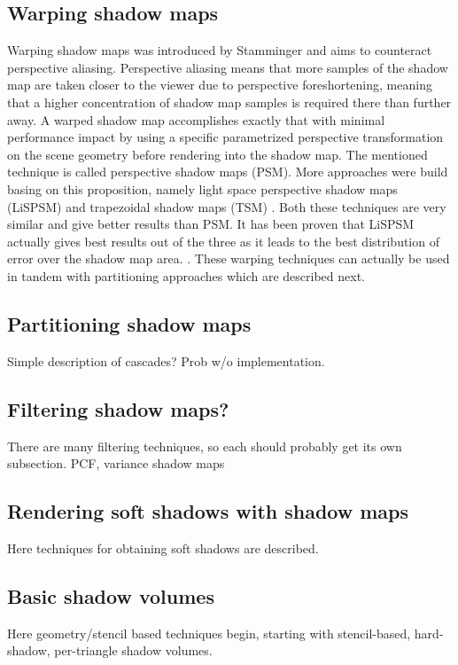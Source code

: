 \subsection{Warping shadow maps}
Warping shadow maps was introduced by Stamminger \cite{bib:article:stamminger_psm} and aims to counteract perspective aliasing. Perspective aliasing means that more samples of the shadow map are taken closer to the viewer due to perspective foreshortening, meaning that a higher concentration of shadow map samples is required there than further away. A warped shadow map accomplishes exactly that with minimal performance impact by using a specific parametrized perspective transformation on the scene geometry before rendering into the shadow map. The mentioned technique is called perspective shadow maps (PSM). More approaches were build basing on this proposition, namely light space perspective shadow maps (LiSPSM) \cite{bib:proc:wimmer_lispsm} and trapezoidal shadow maps (TSM) \cite{bib:proc:matrin_tsm}. Both these techniques are very similar and give better results than PSM. It has been proven that LiSPSM actually gives best results out of the three as it leads to the best distribution of error over the shadow map area. \cite{bib:proc:lloyd_lispsm_vs_tsm}. These warping techniques can actually be used in tandem with partitioning approaches which are described next.

\subsection{Partitioning shadow maps}
Simple description of cascades? Prob w/o implementation.

\subsection{Filtering shadow maps?}
There are many filtering techniques, so each should probably get its own subsection. PCF, variance shadow maps

\subsection{Rendering soft shadows with shadow maps}
Here techniques for obtaining soft shadows are described.

\subsection{Basic shadow volumes}
Here geometry/stencil based techniques begin, starting with stencil-based, hard-shadow, per-triangle shadow volumes.

